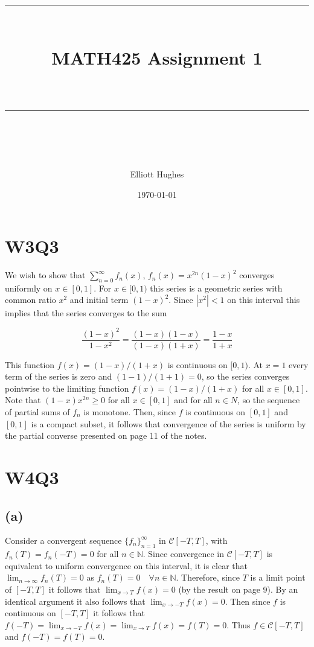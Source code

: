 \documentclass{article}
\title{	
	\normalfont\normalsize 
	\rule{\linewidth}{0.5pt}\\ %
	\vspace{14pt} %
	{\LARGE MATH425 Assignment 1\\ %
    \large \textit{} \\}
	\vspace{6pt} %
	\rule{\linewidth}{1pt}\\ %
}
\author{Elliott Hughes}
\date{\normalsize\today}
\begin{document}
\maketitle

\section*{W3Q3}
We wish to show that $\sum_{n=0}^\infty f_n(x)$, $f_n(x) = x^{2n}(1-x)^2$ converges 
uniformly on $x \in [0,1]$. For $x \in [0,1)$ this series is a geometric series with common 
ratio $x^2$ and initial term $(1-x)^2$. Since $|x^2|<1$ on this interval this implies that the series converges to the sum 

\begin{equation*}
	\frac{(1-x)^2}{1-x^2} = \frac{(1-x)(1-x)}{(1-x)(1+x)} = \frac{1-x}{1+x}
\end{equation*}

This function $f(x) = (1-x)/(1+x)$ is continuous on $[0,1)$. At $x = 1$ every term of the series is zero and 
$(1-1)/(1+1) = 0$, so the series converges pointwise to the limiting function $f(x) = (1-x)/(1+x)$ 
for all $x \in [0,1]$. Note that $(1-x)x^{2n} \geq 0$ for all $x \in [0,1]$ and for all $n \in N$, so 
the sequence of partial sums of $f_n$ is monotone. Then, since $f$ is continuous on $[0,1]$ and $[0,1]$ is a 
compact subset, it follows that convergence of the series is uniform by the partial converse presented 
on page 11 of the notes.

\section*{W4Q3}
\subsection*{(a)}
Consider a convergent sequence $\{f_n\}_{n=1}^\infty$ in $\mathscr{C}[-T,T]$, with $f_n(T) = f_n(-T) = 0$ for 
all $n \in \mathbb{N}$. Since convergence in $\mathcal{C}[-T,T]$ is equivalent to uniform convergence 
on this interval, it is clear that $\lim_{n \rightarrow \infty}f_n(T) = 0$ as $f_n(T) = 0\quad \forall n \in \mathbb{N}$. 
Therefore, since $T$ is a limit point of $[-T,T]$ it follows that 
$\lim_{x \rightarrow T}f(x) = 0$ (by the result on page 9). By an identical argument it also 
follows that $\lim_{x \rightarrow -T}f(x) = 0$. Then since $f$ is continuous on $[-T,T]$ it follows 
that $f(-T) = \lim_{x \rightarrow -T}f(x) = \lim_{x \rightarrow T}f(x) = f(T) = 0$. Thus $f \in \mathcal{C}[-T,T]$ 
and $f(-T) = f(T) = 0$. 
\end{document}
